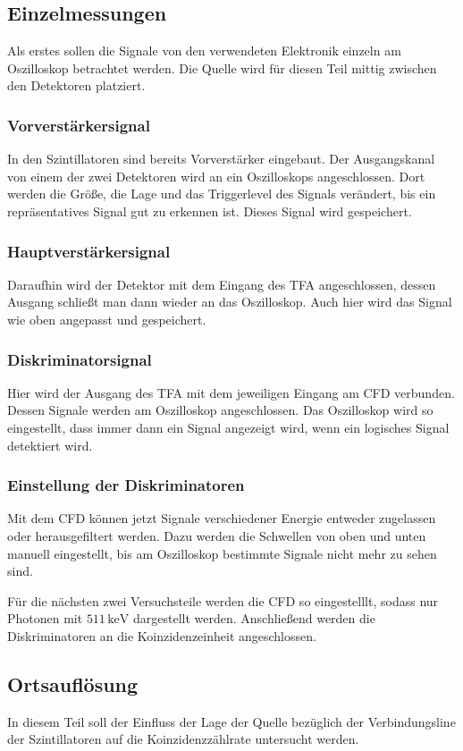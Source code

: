 \documentclass[12pt,a4paper]{scrartcl}
\numberwithin{equation}{section} %
\newcommand{\pu}[1]{\ensuremath{\mathrm{#1}}}
\begin{document}
\subsection{Einzelmessungen}
Als erstes sollen die Signale von den verwendeten Elektronik einzeln am Oszilloskop betrachtet werden. Die Quelle wird für diesen Teil mittig zwischen den Detektoren platziert.

\subsubsection{Vorverstärkersignal}
In den Szintillatoren sind bereits Vorverstärker eingebaut. Der Ausgangskanal von einem der zwei Detektoren wird an ein Oszilloskops angeschlossen. Dort werden die Größe, die Lage und das Triggerlevel des Signals verändert, bis ein repräsentatives Signal gut zu erkennen ist. Dieses Signal wird gespeichert.

\subsubsection{Hauptverstärkersignal}
Daraufhin wird der Detektor mit dem Eingang des TFA angeschlossen, dessen Ausgang schließt man dann wieder an das Oszilloskop. Auch hier wird das Signal wie oben angepasst und gespeichert.

\subsubsection{Diskriminatorsignal}
Hier wird der Ausgang des TFA mit dem jeweiligen Eingang am CFD verbunden. Dessen Signale werden am Oszilloskop angeschlossen. Das Oszilloskop wird so eingestellt, dass immer dann ein Signal angezeigt wird, wenn ein logisches Signal detektiert wird.

\subsubsection{Einstellung der Diskriminatoren}
Mit dem CFD können jetzt Signale verschiedener Energie entweder zugelassen oder herausgefiltert werden. Dazu werden die Schwellen von oben und unten manuell eingestellt, bis am Oszilloskop bestimmte Signale nicht mehr zu sehen sind.

Für die nächsten zwei Versuchsteile werden die CFD so eingestelllt, sodass nur Photonen mit $\pu{511\, keV}$ dargestellt werden. Anschließend werden die Diskriminatoren an die Koinzidenzeinheit angeschlossen.

\subsection{Ortsauflösung}
\label{sec:Ortsauflösung}
In diesem Teil soll der Einfluss der Lage der Quelle bezüglich der Verbindungsline der Szintillatoren auf die Koinzidenzzählrate untersucht werden.
\end{document}
